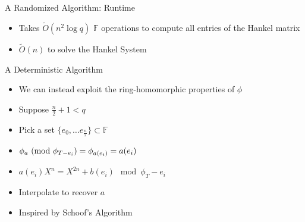 \documentclass{beamer}
\newcommand{\f}{\mathbb{F}}
\newcommand{\ot}{\widetilde{O}}
\begin{document}

\begin{frame}{A Randomized Algorithm: Runtime}
    \begin{itemize}
        \item Takes $\ot(n^2 \log q)$ $\f$ operations to compute all entries of the Hankel matrix
    \item $\ot(n)$ to solve the Hankel System
    \end{itemize}
\end{frame}


\begin{frame}{A Deterministic Algorithm}

\begin{itemize}
    \item We can instead exploit the ring-homomorphic properties of $\phi$
    \item Suppose $ \frac{n}{2} + 1 < q$
    \item Pick a set $\{e_0, \ldots e_{\frac{n}{2}}\} \subset \mathbb{F}$
    \item $\phi_a \textnormal{ (mod } \phi_{T - e_i} \textnormal{)} = \phi_{a(e_i)} = a(e_i)$
    \item $a(e_i) X^n  = X^{2n} + b(e_i) \mod \phi_{T} - e_i $
    \item Interpolate to recover $a$
    \item Inspired by Schoof's Algorithm
\end{itemize}
    
\end{frame}


\end{document}

